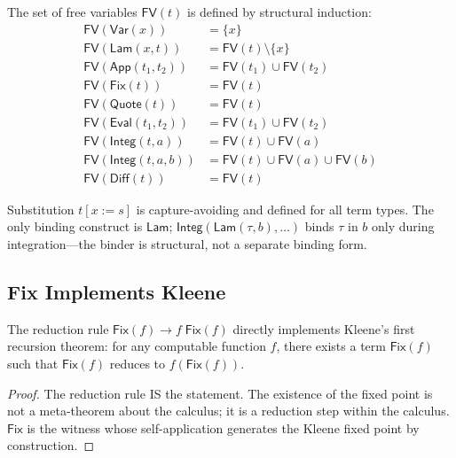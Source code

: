 \documentclass{lmcs}
\theoremstyle{plain}
\theoremstyle{definition}
\newcommand{\app}[2]{#1\;#2}
\newcommand{\fix}{\mathsf{Fix}}
\begin{document}
\begin{defi}
The set of free variables $\mathsf{FV}(t)$ is defined by structural
induction:
\begin{align*}
\mathsf{FV}(\mathsf{Var}(x)) &= \{x\} \\
\mathsf{FV}(\mathsf{Lam}(x, t)) &= \mathsf{FV}(t) \setminus \{x\} \\
\mathsf{FV}(\mathsf{App}(t_1, t_2)) &= \mathsf{FV}(t_1) \cup
  \mathsf{FV}(t_2) \\
\mathsf{FV}(\fix(t)) &= \mathsf{FV}(t) \\
\mathsf{FV}(\mathsf{Quote}(t)) &= \mathsf{FV}(t) \\
\mathsf{FV}(\mathsf{Eval}(t_1, t_2)) &= \mathsf{FV}(t_1) \cup
  \mathsf{FV}(t_2) \\
\mathsf{FV}(\mathsf{Integ}(t, a)) &= \mathsf{FV}(t) \cup \mathsf{FV}(a) \\
\mathsf{FV}(\mathsf{Integ}(t, a, b)) &= \mathsf{FV}(t) \cup \mathsf{FV}(a)
  \cup \mathsf{FV}(b) \\
\mathsf{FV}(\mathsf{Diff}(t)) &= \mathsf{FV}(t)
\end{align*}
\end{defi}

Substitution $t[x := s]$ is capture-avoiding and defined for all term types.
The only binding construct is $\mathsf{Lam}$;
$\mathsf{Integ}(\mathsf{Lam}(\tau, b), \dots)$ binds $\tau$ in $b$ only
during integration---the binder is structural, not a separate binding form.

\subsection{Fix Implements Kleene}

\begin{thm}\label{thm:kleene}
The reduction rule $\fix(f) \to \app{f}{\fix(f)}$ directly implements
Kleene's first recursion theorem: for any computable function $f$, there
exists a term $\fix(f)$ such that $\fix(f)$ reduces to $f(\fix(f))$.
\end{thm}

\begin{proof}
The reduction rule IS the statement. The existence of the fixed point is
not a meta-theorem about the calculus; it is a reduction step within the
calculus. $\fix$ is the witness whose self-application generates the
Kleene fixed point by construction.
\end{proof}
\end{document}
